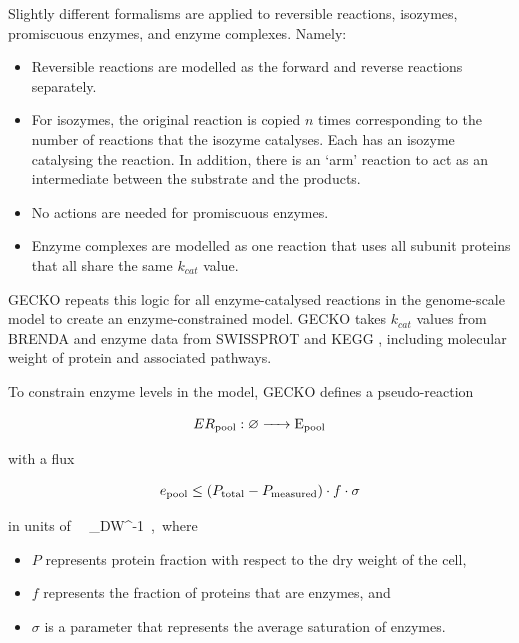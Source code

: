 
Slightly different formalisms are applied to reversible reactions, isozymes, promiscuous enzymes, and enzyme complexes.  Namely:
\begin{itemize}
  \item Reversible reactions are modelled as the forward and reverse reactions separately.
  \item For isozymes, the original reaction is copied $n$ times corresponding to the number of reactions that the isozyme catalyses. Each has an isozyme catalysing the reaction.
  In addition, there is an `arm' reaction to act as an intermediate between the substrate and the products.
  \item No actions are needed for promiscuous enzymes.
  \item Enzyme complexes are modelled as one reaction that uses all subunit proteins that all share the same $k_{cat}$ value.
\end{itemize}

GECKO repeats this logic for all enzyme-catalysed reactions in the genome-scale model to create an enzyme-constrained model.
GECKO takes $k_{cat}$ values from BRENDA \parencite{changBRENDAELIXIRCore2021} and enzyme data from SWISSPROT \parencite{theuniprotconsortiumUniProtUniversalProtein2023} and KEGG \parencite{kanehisaKEGGTaxonomybasedAnalysis2023}, including molecular weight of protein and associated pathways.

To constrain enzyme levels in the model, GECKO defines a pseudo-reaction

\begin{equation}
  ER_{\mathrm{pool}}: \varnothing \ce{ -> E_{pool} }
  \label{eq:model-gecko-enzyme-pool}
\end{equation}

with a flux

\begin{equation}
  e_{\mathrm{pool}} \leq (P_{\mathrm{total}} - P_{\mathrm{measured}}) \cdot f \cdot \sigma
  \label{eq:model-gecko-enzyme-pool-flux}
\end{equation}

in units of \SI{}{\gram~\gram_{DW}^{-1}}, where

\begin{itemize}
  \item $P$ represents protein fraction with respect to the dry weight of the cell,
  \item $f$ represents the fraction of proteins that are enzymes, and
  \item $\sigma$ is a parameter that represents the average saturation of enzymes.
\end{itemize}

